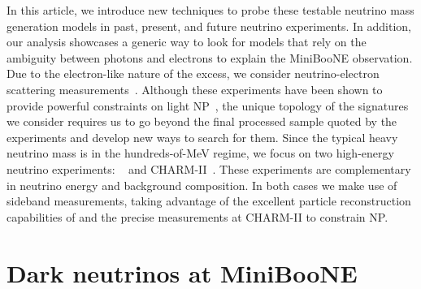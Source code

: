 In this article, we introduce new techniques to probe these testable neutrino mass generation models in past, present, and future neutrino experiments. In addition, our analysis showcases a generic way to look for models that rely on the ambiguity between photons and electrons to explain the MiniBooNE observation. Due to the electron-like nature of the excess, we consider neutrino-electron scattering measurements~\cite{Auerbach:2001wg, Deniz:2009mu,Bellini:2011rx,Park:2013dax,Vilain:1994qy}. Although these experiments have been shown to provide powerful constraints on light NP~\cite{Pospelov:2017kep,Lindner:2018kjo,Magill:2018tbb}, the unique topology of the signatures we consider requires us to go beyond the final processed sample quoted by the experiments and develop new ways to search for them.
Since the typical heavy neutrino mass is in the hundreds-of-MeV regime, we focus on two high-energy neutrino experiments: \minerva~\cite{Park:2013dax,Park:2015eqa,Valencia-Rodriguez:2016vkf} and CHARM-II~\cite{DeWinter:1989zg,Geiregat:1992zv,Vilain:1994qy}. These experiments are complementary in neutrino energy and background composition. In both cases we make use of sideband measurements, taking advantage of the excellent particle reconstruction capabilities of \minerva and the precise measurements at CHARM-II to constrain NP.
%

\section{Dark neutrinos at MiniBooNE}

